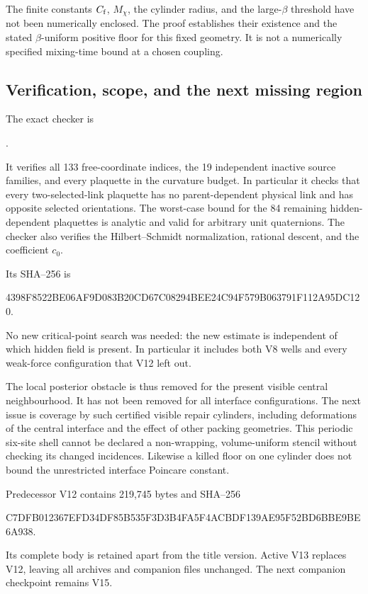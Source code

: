 \documentclass[11pt,oneside]{article}
\begin{document}
The finite constants \(C_{\rm f}\),
\(M_\chi\), the cylinder radius, and
the large-\(\beta\) threshold have not
been numerically enclosed. The proof
establishes their existence and the
stated \(\beta\)-uniform positive
floor for this fixed geometry.
It is not a numerically specified
mixing-time bound at a chosen coupling.

\subsection{Verification, scope, and the next missing region}

The exact checker is
\begin{center}\small
{}.
\end{center}
It verifies all 133 free-coordinate indices,
the 19 independent inactive source
families, and every plaquette in the
curvature budget. In particular it
checks that every two-selected-link
plaquette has no parent-dependent
physical link and has opposite selected
orientations. The worst-case bound for
the 84 remaining hidden-dependent
plaquettes is analytic and valid for
arbitrary unit quaternions. The checker
also verifies the Hilbert--Schmidt
normalization, rational descent, and
the coefficient \(c_0\).

Its SHA--256 is
\begin{center}\scriptsize\ttfamily
4398F8522BE06AF9D083B20CD67C08294BEE24C94F579B063791F112A95DC120.
\end{center}
No new critical-point search was needed:
the new estimate is independent of
which hidden field is present. In
particular it includes both V8 wells
and every weak-force configuration
that V12 left out.

The local posterior obstacle is thus
removed for the present visible central
neighbourhood. It has not been removed
for all interface configurations.
The next issue is coverage by such
certified visible repair cylinders,
including deformations of the central
interface and the effect of other
packing geometries. This periodic
six-site shell cannot be declared a
non-wrapping, volume-uniform stencil
without checking its changed incidences.
Likewise a killed floor on one cylinder
does not bound the unrestricted
interface Poincare constant.

Predecessor V12 contains 219,745 bytes
and SHA--256
\begin{center}\scriptsize\ttfamily
C7DFB012367EFD34DF85B535F3D3B4FA5F4ACBDF139AE95F52BD6BBE9BE6A938.
\end{center}
Its complete body is retained apart
from the title version. Active V13
replaces V12, leaving all archives
and companion files unchanged. The
next companion checkpoint remains V15.
\end{document}
